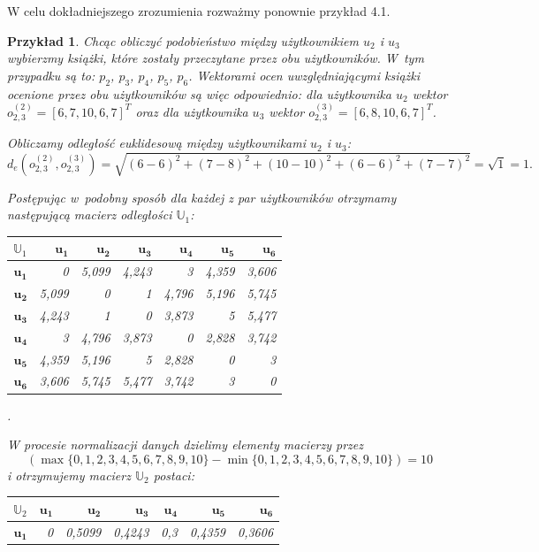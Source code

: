 \documentclass[12pt,a4paper]{report}
\newtheorem{przyklad}{Przykład}[chapter]{\normalfont}
\begin{document}
W celu dokładniejszego zrozumienia rozważmy ponownie przykład 4.1.

\begin{przyklad}
Chcąc obliczyć podobieństwo między użytkownikiem $u_2$ i $u_3$ wybierzmy książki, które zostały przeczytane przez obu użytkowników. W~tym przypadku są to: $p_2$, $p_3$, $p_4$, $p_5$, $p_6$. Wektorami ocen uwzględniającymi książki ocenione przez obu użytkowników są więc odpowiednio: dla użytkownika $u_2$ wektor $o_{2,3} ^{(2)} = [6, 7, 10, 6, 7] ^ T$ oraz dla użytkownika $u_3$ wektor $o_{2,3}^{(3)} = [6, 8, 10, 6, 7] ^ T$.

Obliczamy odległość euklidesową między użytkownikami $u_2$ i $u_3$: 
$$
d_{e}(o_{2,3}^{(2)},o_{2,3}^{(3)}) = \sqrt{(6-6)^2 + (7-8)^2 + (10-10)^2 + (6-6)^2 + (7-7)^2} = \sqrt{1} = 1.
$$

Postępując w~podobny sposób dla każdej z par użytkowników otrzymamy następującą macierz odległości $\mathbb{U}_1$:
\begin{center}
\begin{tabular}{|r|r|r|r|r|r|r|} \hline
$\mathbb{U}_1$ & $\mathbf{u_1}$ & $\mathbf{u_2}$ & $\mathbf{u_3}$ & $\mathbf{u_4}$ & $\mathbf{u_5}$ & $\mathbf{u_6}$ \\
\hline
$\mathbf{u_1}$ & 0 & 5,099 & 4,243 & 3 & 4,359 & 3,606 \\
\hline
$\mathbf{u_2}$ & 5,099 & 0 & 1 & 4,796 & 5,196 & 5,745 \\
\hline
$\mathbf{u_3}$ & 4,243 & 1 & 0 & 3,873 & 5 & 5,477 \\
\hline
$\mathbf{u_4}$ & 3 & 4,796 & 3,873 & 0 & 2,828 & 3,742  \\
\hline 
$\mathbf{u_5}$ & 4,359 & 5,196 & 5 & 2,828 & 0 & 3 \\
\hline 
$\mathbf{u_6}$ & 3,606 & 5,745 & 5,477 & 3,742 & 3 & 0  \\
\hline 
\end{tabular}.
\end{center}
W procesie normalizacji danych dzielimy elementy macierzy przez 
$$
(\max\{0,1,2,3,4,5,6,7,8,9,10\} - \min\{0,1,2,3,4,5,6,7,8,9,10\}) = 10
$$ 
i otrzymujemy macierz $\mathbb{U}_2$ postaci:
\begin{center}
\begin{tabular}{|r|r|r|r|r|r|r|} \hline
$\mathbb{U}_2$ & $\mathbf{u_1}$ & $\mathbf{u_2}$ & $\mathbf{u_3}$ & $\mathbf{u_4}$ & $\mathbf{u_5}$ & $\mathbf{u_6}$ \\
\hline
$\mathbf{u_1}$ & 0 & 0,5099 & 0,4243 & 0,3 & 0,4359 & 0,3606 \\

\end{tabular}
\end{center}
\end{przyklad}
\end{document}
